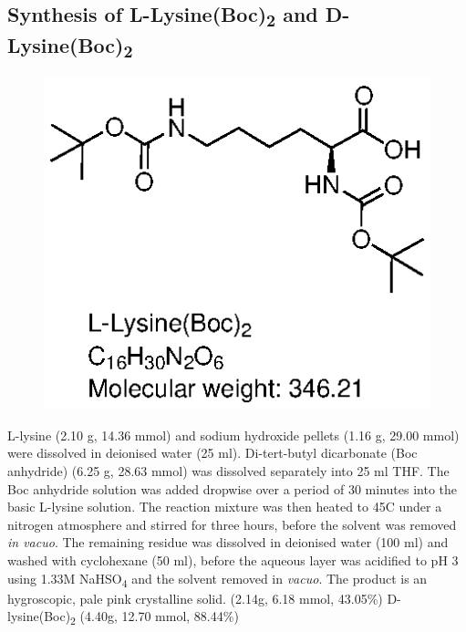 \subsection*{Synthesis of L-Lysine(Boc)\textsubscript{2} and D-Lysine(Boc)\textsubscript{2}}
\begin{figure} [h!]
\centering
\includegraphics{Figures/L-Lys_boc_2.eps}
\end{figure}
L-lysine (2.10 g, 14.36 mmol) and  sodium hydroxide pellets (1.16 g, 29.00 mmol) were dissolved in deionised water (25 ml).   Di-tert-butyl dicarbonate (Boc anhydride) (6.25 g, 28.63 mmol) was dissolved separately into 25 ml THF.  The Boc anhydride solution was added dropwise over a period of 30 minutes into the basic L-lysine solution.  The reaction mixture was then heated to 45\textdegree C under a nitrogen atmosphere and stirred for three hours, before the solvent was removed \textit{in vacuo}. 
\newline
The remaining residue was dissolved in deionised water (100 ml) and washed with cyclohexane (50 ml), before the aqueous layer was acidified to pH 3 using 1.33M NaHSO\textsubscript{4} and the solvent removed in \textit{vacuo}.  The product is an hygroscopic, pale pink crystalline solid. (2.14g, 6.18 mmol,  43.05\%) D-lysine(Boc)\textsubscript{2} (4.40g, 12.70 mmol, 88.44\%)

